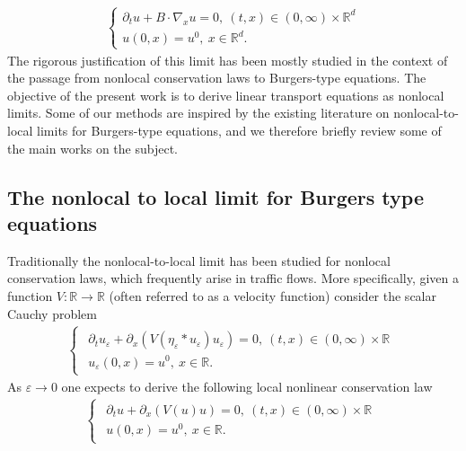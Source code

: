 \documentclass[11pt,reqno]{amsart}
\numberwithin{equation}{section}
\begin{document}
\begin{align}
\begin{cases}
\partial_{t}u+B\cdot \nabla_{x}u=0, \ (t,x)\in (0,\infty)\times \mathbb{R}^{d}\\
u(0,x)=u^{0}, \ x\in \mathbb{R}^{d}. 
\end{cases}  
\label{local Cauchy}
\end{align} 
The rigorous justification of this limit has been mostly studied in the context of the passage from nonlocal conservation laws to Burgers-type equations. The objective of the present work is to derive linear transport equations as nonlocal limits. Some of our methods are inspired by the existing literature on nonlocal-to-local limits for Burgers-type equations, and we therefore briefly review some of the main works on the subject.
\subsection{The nonlocal to local limit for Burgers type equations}  
Traditionally the nonlocal-to-local limit has been studied for nonlocal conservation laws, which frequently arise in traffic flows. More specifically, given a function $V:\mathbb{R}\rightarrow \mathbb{R}$ (often referred to as a velocity function) consider the scalar Cauchy problem 
\begin{align}
\begin{cases}
\begin{array}{lc}
\partial_{t}u_{\varepsilon}+\partial_{x}(V(\eta_{\varepsilon}\ast u_{\varepsilon})u_{\varepsilon})=0, \ (t,x)\in (0,\infty)\times \mathbb{R}\\
u_{\varepsilon}(0,x)=u^{0},\ x\in \mathbb{R}.
\end{array}
\end{cases}
\label{nonlocal conservation}
\end{align}
As $\varepsilon\rightarrow 0$ one expects to derive the following local nonlinear conservation law 
\begin{align}
\begin{cases}
\begin{array}{lc}
\partial_{t}u+\partial_{x}(V(u)u)=0, \ (t,x)\in (0,\infty)\times \mathbb{R}\\
u(0,x)=u^{0}, \ x\in \mathbb{R}. 
\end{array}\end{cases}   
\label{local Burgers}
\end{align}
\end{document}
